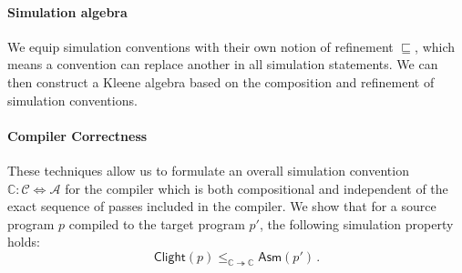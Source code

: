\documentclass[sigplan,10pt,review,anonymous]{acmart}\settopmatter{printfolios=true,printccs=false,printacmref=false}
\newcommand{\kw}[1]{\ensuremath{ \mathsf{#1} }}
\begin{document}
\paragraph{Simulation algebra} %

We equip simulation conventions
with their own notion of refinement $\sqsubseteq$,
which means a convention can replace another
in all simulation statements.
We can then construct a Kleene algebra
based on the composition and refinement of simulation conventions.


\paragraph{Compiler Correctness} \label{sec:compcert:overview} %

These techniques allow us to formulate an overall
simulation convention
$\mathbb{C} : \mathcal{C} \Leftrightarrow \mathcal{A}$
for the compiler which is both compositional
and independent of the exact sequence of passes
included in the compiler.
We show that for a source program $p$
compiled to the target program $p'$,
the following simulation property holds:
\[
    \kw{Clight}(p)
    \le_{\mathbb{C} \twoheadrightarrow \mathbb{C}}
    \kw{Asm}(p') \,.
\]


\end{document}
